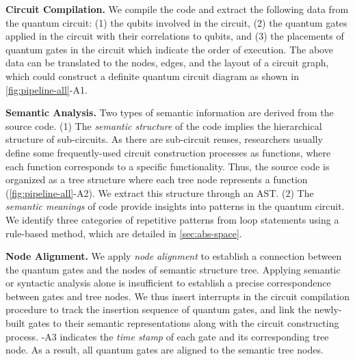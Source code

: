 \textbf{Circuit Compilation.}
We compile the code and extract the following data from the quantum circuit:
(1) the qubits involved in the circuit,
(2) the quantum gates applied in the circuit with their correlations to qubits, and
(3) the placements of quantum gates in the circuit which indicate the order of execution. 
The above data can be translated to the nodes, edges, and the layout of a circuit graph, which could construct a definite quantum circuit diagram as shown in \cref{fig:pipeline-all}-A1.


\textbf{Semantic Analysis.}
Two types of semantic information are derived from the source code.
(1) The \emph{semantic structure} of the code implies the hierarchical structure of sub-circuits.
As there are sub-circuit reuses, researchers usually define some frequently-used circuit construction processes as functions, where each function corresponds to a specific functionality.
Thus, the source code is organized as a tree structure where each tree node represents a function (\cref{fig:pipeline-all}-A2).
We extract this structure through an AST.
(2) The \emph{semantic meanings} of code provide insights into patterns in the quantum circuit.
We identify three categories of repetitive patterns from loop statements using a rule-based method, which are detailed in \cref{sec:abs-space}.

\textbf{Node Alignment.}
We apply \emph{node alignment} to establish a connection between the quantum gates and the nodes of semantic structure tree.
Applying semantic or syntactic analysis alone is insufficient to establish a precise correspondence between gates and tree nodes.
We thus insert interrupts in the circuit compilation procedure to track the insertion sequence of quantum gates,
and link the newly-built gates to their semantic representations along with the circuit constructing process. -A3 indicates the \emph{time stamp} of each gate and its corresponding tree node.
As a result, all quantum gates are aligned to the semantic tree nodes.



